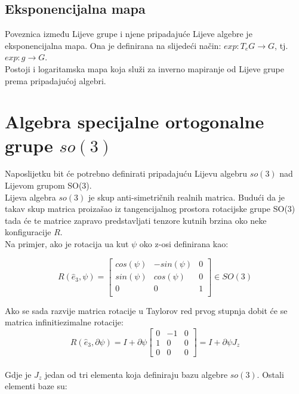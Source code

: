 \documentclass[times, utf8, diplomski, numeric]{fer}
\begin{document}
	\subsection{Eksponencijalna mapa} Poveznica između Lijeve grupe i njene pripadajuće Lijeve algebre je eksponencijalna mapa. Ona je definirana na slijedeći način: $exp: T_eG \rightarrow	G$, tj. $exp: g \rightarrow G.$ \\ Postoji i logaritamska mapa koja služi za inverno mapiranje od Lijeve grupe prema pripadajućoj algebri.

\section{Algebra specijalne ortogonalne grupe $so(3)$}

	Naposlijetku bit će potrebno definirati pripadajuću Lijevu algebru $so(3)$ nad Lijevom grupom SO(3). \\
	Lijeva algebra $so(3)$ je skup anti-simetričnih realnih matrica. Budući da je takav skup matrica proizašao iz tangencijalnog prostora rotacijske grupe SO(3) tada će te matrice zapravo predstavljati tenzore kutnih brzina oko neke konfiguracije $R$. \\
	Na primjer, ako je rotacija ua kut $\psi$ oko z-osi definirana kao:
	
	\begin{equation}
		R( \hat{e}_3, \psi ) = 
		\begin{bmatrix}
			cos(\psi)	&	-sin(\psi)	&	0 \\
			sin(\psi)	&	cos(\psi)	&	0 \\
			0			&	0			&	1 \\	
		\end{bmatrix} \in SO(3)
	\end{equation}
	
	Ako se sada razvije matrica rotacije u Taylorov red prvog stupnja dobit će se matrica infinitiezimalne rotacije: \\
	\begin{equation}
		R( \hat{e}_3, \partial \psi ) = I + \partial \psi 
		\begin{bmatrix}
			0	&	-1	&	0 \\
			1	&	0	&	0 \\
			0	&	0 	&	0
		\end{bmatrix}
		= I + \partial \psi J_z
	\end{equation}
	\\
	\noindent Gdje je $J_z$ jedan od tri elementa koja definiraju bazu algebre $so(3)$. Ostali elementi baze su:
	
\end{document}
